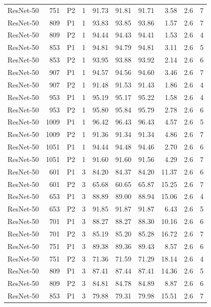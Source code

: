 {\begin{longtable}{lrllrrrrrr}
ResNet-50 & 751 & P2 & 1 & 91.73 & 91.81 & 91.71 & 3.58 & 2.6 & 7 \\
ResNet-50 & 809 & P1 & 1 & 93.83 & 93.85 & 93.86 & 1.57 & 2.6 & 7 \\
ResNet-50 & 809 & P2 & 1 & 94.44 & 94.43 & 94.41 & 1.53 & 2.6 & 4 \\
ResNet-50 & 853 & P1 & 1 & 94.81 & 94.79 & 94.81 & 3.11 & 2.6 & 5 \\
ResNet-50 & 853 & P2 & 1 & 93.95 & 93.88 & 93.92 & 2.14 & 2.6 & 6 \\
ResNet-50 & 907 & P1 & 1 & 94.57 & 94.56 & 94.60 & 3.46 & 2.6 & 7 \\
ResNet-50 & 907 & P2 & 1 & 91.48 & 91.53 & 91.43 & 1.86 & 2.6 & 4 \\
ResNet-50 & 953 & P1 & 1 & 95.19 & 95.17 & 95.22 & 1.58 & 2.6 & 4 \\
ResNet-50 & 953 & P2 & 1 & 95.80 & 95.84 & 95.79 & 2.78 & 2.6 & 6 \\
ResNet-50 & 1009 & P1 & 1 & 96.42 & 96.43 & 96.43 & 4.57 & 2.6 & 5 \\
ResNet-50 & 1009 & P2 & 1 & 91.36 & 91.34 & 91.34 & 4.86 & 2.6 & 7 \\
ResNet-50 & 1051 & P1 & 1 & 94.44 & 94.48 & 94.46 & 2.70 & 2.6 & 6 \\
ResNet-50 & 1051 & P2 & 1 & 91.60 & 91.60 & 91.56 & 4.29 & 2.6 & 7 \\
ResNet-50 & 601 & P1 & 3 & 84.20 & 84.37 & 84.20 & 11.37 & 2.6 & 6 \\
ResNet-50 & 601 & P2 & 3 & 65.68 & 60.65 & 65.87 & 15.25 & 2.6 & 7 \\
ResNet-50 & 653 & P1 & 3 & 88.89 & 89.00 & 88.94 & 15.06 & 2.6 & 4 \\
ResNet-50 & 653 & P2 & 3 & 91.85 & 91.87 & 91.87 & 6.43 & 2.6 & 5 \\
ResNet-50 & 701 & P1 & 3 & 88.27 & 88.27 & 88.30 & 10.16 & 2.6 & 6 \\
ResNet-50 & 701 & P2 & 3 & 85.19 & 85.20 & 85.28 & 16.72 & 2.6 & 7 \\
ResNet-50 & 751 & P1 & 3 & 89.38 & 89.36 & 89.43 & 8.57 & 2.6 & 6 \\
ResNet-50 & 751 & P2 & 3 & 71.36 & 71.59 & 71.29 & 18.14 & 2.6 & 4 \\
ResNet-50 & 809 & P1 & 3 & 87.41 & 87.44 & 87.41 & 14.36 & 2.6 & 5 \\
ResNet-50 & 809 & P2 & 3 & 84.81 & 84.78 & 84.89 & 8.87 & 2.6 & 6 \\
ResNet-50 & 853 & P1 & 3 & 79.88 & 79.31 & 79.98 & 15.51 & 2.6 & 7 \\

\end{longtable}}
